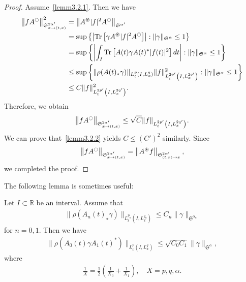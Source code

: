 \documentclass[10pt,a4paper]{amsart}
\newcommand{\oast}{\circledast}
\newcommand{\FS}{\mathfrak{S}}
\newcommand{\al}{\alpha}
\newcommand{\ga}{\gamma}
\newcommand{\rh}{\rho}
\newcommand{\K}[1]{\left(#1\right)}
\newcommand{\abs}[1]{\left|#1\right|}
\DeclareMathOperator{\Tr}{Tr}
\newcommand{\Sxtx}{{\FS^{2\al'}_{x \to (t,x)}}}
\newcommand{\Stxx}{{\FS^{2\al'}_{(t,x) \to x}}}
\newcommand{\st}{\star}
\newcommand{\R}{\mathbb{R}}
\newcommand{\oc}{\ocircle}
\newcommand{\os}{\oast}
\begin{document}
\begin{proof}
Assume~\eqref{lemm3.2.1}. Then we have
\begin{equation}
\begin{split}
\left\|f A^\oc\right\|_\Sxtx^2 &= \left\|A^\os |f|^2 A^\oc\right\|_{\FS^{\al'}} \\
&= \sup \left\{ \left|\Tr\left[\ga A^\os |f|^2 A^\oc\right]\right | : \|\ga\|_{\FS^\al} \le 1\right\} \\
&= \sup \left \{ \abs{\int_I \Tr\left[A(t) \ga A(t)^* |f(t)|^2\right]dt } : \|\ga\|_{\FS^\al} \le 1 \right \} \\
&\le \sup \left \{ \|\rh(A(t)_\st \ga)\|_{L^p_t\left(I,L^q_x\right)} \|f\|_{L^{2p'}_t\left(I,L^{2q'}_x\right)}^2 : \|\ga\|_{\FS^\al} \le 1 \right \} \\
&\le C \|f\|_{L^{2p'}_t\left(I,L^{2q'}_x\right)}^2.
\end{split}
\end{equation}
Therefore, we obtain
\begin{align}
\left\|f A^\oc\right\|_\Sxtx \le \sqrt{C} \|f\|_{L^{2p'}_t\left(I,L^{2q'}_x\right)}.
\end{align}
We can prove that~\eqref{lemm3.2.2} yields $C \le (C')^2$ similarly. Since
\begin{align}
\left\|f A^\oc\right\|_{\Sxtx} = \left\|A^\os f\right\|_{\Stxx},
\end{align}
we completed the proof.
\end{proof}

The following lemma is sometimes useful:

\begin{lemm}\label{asym}
Let $I \subset \R$ be an interval. Assume that
\begin{align}
\|\rh(A_n(t)_\st \ga)\|_{L^{p_n}_t \left(I,L^{q_n}_x\right)} \le C_n \|\ga\|_{\FS^{\al_n}}
\end{align}
for $n=0,1$. Then we have
\begin{align}
\big\|\rh(A_0(t) \ga A_1(t)^*)\big\|_{L^p_t\left(I,L^q_x\right)} \le \sqrt{C_0 C_1} \|\ga\|_{\FS^\al},
\end{align}
where
\begin{align}
\frac{1}{X} = \frac{1}{2} \K{\frac{1}{X_0}+ \frac{1}{X_1}}, \quad X = p,q,\al.
\end{align}
\end{lemm}
\end{document}
